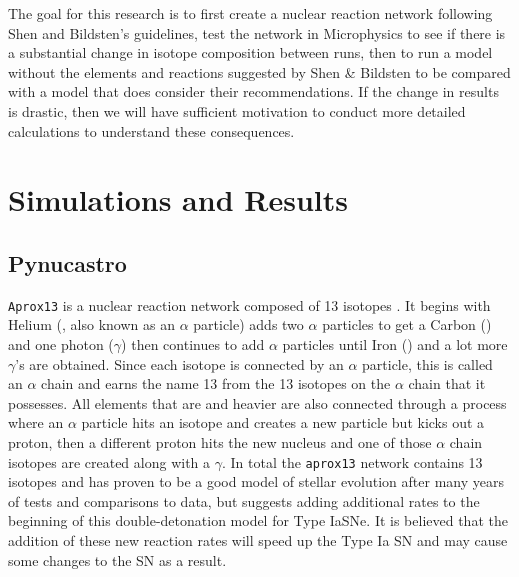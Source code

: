 \documentclass[preprint]{aastex62}
\begin{document}
  The goal for this research is to first create a nuclear reaction network following Shen and Bildsten's guidelines, test the network in Microphysics to see if there is a substantial change in isotope composition between runs, then to run a model without the elements and reactions suggested by Shen \& Bildsten to be compared with a model that does consider their recommendations. If the change in results is drastic, then we will have sufficient motivation to conduct more detailed calculations to understand these consequences. 
  
\section{Simulations and Results}
  
  \subsection{Pynucastro}
    
    {\tt Aprox13} is a nuclear reaction network composed of 13 isotopes \citep{timmes}. It begins with Helium (, also known as an $\alpha$ particle) adds two $\alpha$ particles to get a Carbon () and one photon ($\gamma$) then continues to add $\alpha$ particles until Iron () and a lot more $\gamma$'s are obtained. Since each isotope is connected by an $\alpha$ particle, this is called an $\alpha$ chain and earns the name 13 from the 13 isotopes on the $\alpha$ chain that it possesses. All elements that are  and heavier are also connected through a process where an $\alpha$ particle hits an isotope and creates a new particle but kicks out a proton, then a different proton hits the new nucleus and one of those $\alpha$ chain isotopes are created along with a $\gamma$. In total the {\tt aprox13} network contains 13 isotopes and has proven to be a good model of stellar evolution after many years of tests and comparisons to data, but \citet{shenNbildsten} suggests adding additional rates to the beginning of this double-detonation model for Type IaSNe. It is believed that the addition of these new reaction rates will speed up the Type Ia SN and may cause some changes to the SN as a result.   
    
\end{document}
